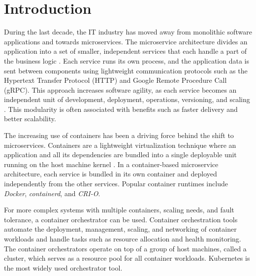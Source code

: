 \documentclass[english, 12pt, a4paper, sci, utf8, a-2b, online]{aaltothesis}
\begin{document}
\cleardoublepage

\thispagestyle{empty}

\section{Introduction} \label{sec:intro}

During the last decade, the IT industry has moved away from monolithic software applications and towards microservices.
The microservice architecture divides an application into a set of smaller, independent services that each handle a part of the business logic \cite{fowler2014microservices}.
Each service runs its own process, and the application data is sent between components using lightweight communication protocols such as the Hypertext Transfer Protocol (HTTP) and Google Remote Procedure Call (gRPC).
This approach increases software agility, as each service becomes an independent unit of development, deployment, operations, versioning, and scaling \cite{jamshidi2018microservices}.
This modularity is often associated with benefits such as faster delivery and better scalability.

The increasing use of containers has been a driving force behind the shift to microservices.
Containers are a lightweight virtualization technique where an application and all its dependencies are bundled into a single deployable unit running on the host machine kernel \cite{bui2015analysis}.
In a container-based microservice architecture, each service is bundled in its own container and deployed independently from the other services.
Popular container runtimes include \emph{Docker}, \emph{containerd}, and \emph{CRI-O}.

For more complex systems with multiple containers, scaling needs, and fault tolerance, a container orchestrator can be used.
Container orchestration tools automate the deployment, management, scaling, and networking of container workloads and handle tasks such as resource allocation and health monitoring.
The container orchestrators operate on top of a group of host machines, called a cluster, which serves as a resource pool for all container workloads.
Kubernetes is the most widely used orchestrator tool.
\end{document}
